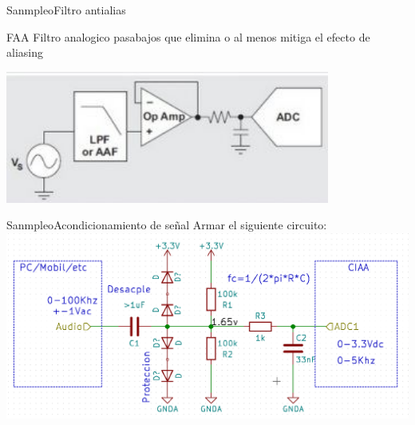 \documentclass{beamer}
\begin{document}
\begin{darkframes}
   \begin{frame}{Sanmpleo}{Filtro antialias}
      \begin{block}{FAA}
         Filtro \alert{analogico} pasabajos que elimina o al menos mitiga el efecto de aliasing
      \end{block}
      \center\includegraphics[width=0.8\textwidth]{1_clase/filtro_anti_aliasing}
      \vfill
   \end{frame}

   \begin{frame}{Sanmpleo}{Acondicionamiento de señal}
      Armar el siguiente circuito:
      \protoboardicon
      \center\includegraphics[width=1\textwidth]{1_clase/circuito}
      \vfill
   \end{frame}























































\end{darkframes}
\end{document}
